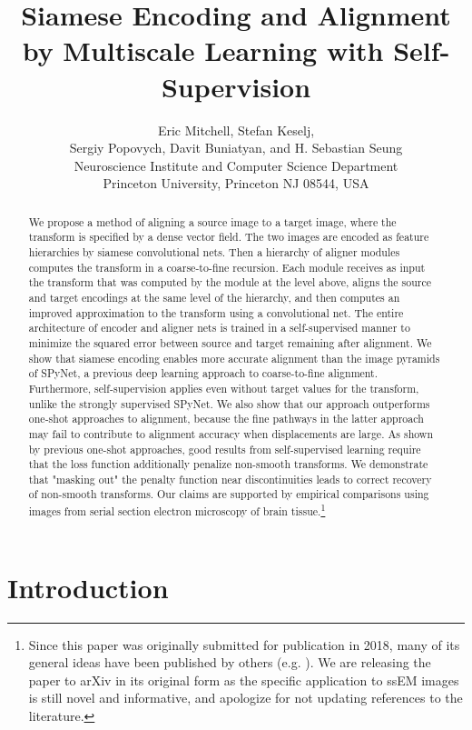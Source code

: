 \documentclass{article}
\title{Siamese Encoding and Alignment by Multiscale Learning with Self-Supervision}
\author{
  Eric Mitchell, Stefan Keselj,\\
  Sergiy Popovych, Davit Buniatyan, and H. Sebastian Seung\\
  Neuroscience Institute and
  Computer Science Department\\
  Princeton University, Princeton NJ 08544, USA
}
\begin{document}

\maketitle

\begin{abstract}
We propose a method of aligning a source image to a target image,
where the transform is specified by a dense vector field. The two
images are encoded as feature hierarchies by siamese convolutional nets. Then a hierarchy of aligner modules computes the transform in a coarse-to-fine recursion. Each module receives as input the transform that was computed by the module at the level above, aligns the source and target encodings at the same level of the hierarchy, and then computes an improved approximation to the transform using a convolutional net. The entire architecture of encoder and aligner nets is trained in a self-supervised manner to minimize the squared error between source and target remaining after alignment. We show that siamese encoding enables more accurate
alignment than the image pyramids of SPyNet, a previous deep learning
approach to coarse-to-fine alignment. Furthermore, self-supervision applies even without target values for the transform, unlike the strongly supervised SPyNet. We also show that our approach outperforms one-shot approaches to alignment, because the fine pathways in the latter approach may fail to contribute to
alignment accuracy when displacements are large. As shown by previous one-shot approaches, good results from self-supervised learning require that the loss function additionally penalize non-smooth transforms. We demonstrate that
"masking out" the penalty function near discontinuities leads to
correct recovery of non-smooth transforms. Our claims are supported by empirical comparisons using images from serial section electron microscopy of brain tissue.\footnote{Since this paper was originally submitted for publication in 2018, many of its general ideas have been published by others (e.g. \citet{hui2018liteflownet}). We are releasing the paper to arXiv in its original form as the specific application to ssEM images is still novel and informative, and apologize for not updating references to the literature.}
\end{abstract}

\section{Introduction}
\end{document}
